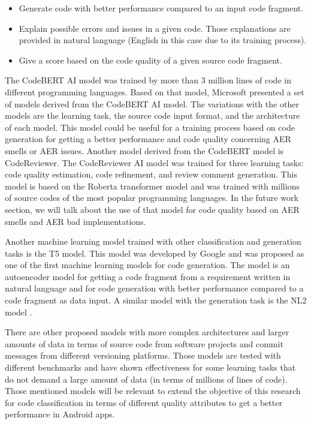 \begin{itemize}
	\item Generate code with better performance compared to an input code fragment.
	\item Explain possible errors and issues in a given code. Those explanations are provided in natural language (English in this case due to its training process).
	\item Give a score based on the code quality of a given source code fragment.
\end{itemize}

The CodeBERT AI model was trained by more than 3 million lines of code in different programming languages. Based on that model, Microsoft presented a set of models derived from the CodeBERT AI model. The variations with the other models are the learning task, the source code input format, and the architecture of each model. This model could be useful for a training process based on code generation for getting a better performance and code quality concerning AER smells or AER issues.
Another model derived from the CodeBERT model is CodeReviewer. The CodeReviewer AI model was trained for three learning tasks: code quality estimation, code refinement, and review comment generation. This model is based on the Roberta transformer model and was trained with millions of source codes of the most popular programming languages. In the future work section, we will talk about the use of that model for code quality based on AER smells and AER bad implementations.


Another machine learning model trained with other classification and generation tasks is the T5 model. This model was developed by Google and was proposed as one of the first machine learning models for code generation. The model is an autoencoder model for getting a code fragment from a requirement written in natural language and for code generation with better performance compared to a code fragment as data input. A similar model with the generation task is the NL2 model \cite{nl2_model}.

There are other proposed models with more complex architectures and larger amounts of data in terms of source code from software projects and commit messages from different versioning platforms. Those models are tested with different benchmarks and have shown effectiveness for some learning tasks that do not demand a large amount of data (in terms of millions of lines of code). Those mentioned models will be relevant to extend the objective of this research for code classification in terms of different quality attributes to get a better performance in Android apps.

